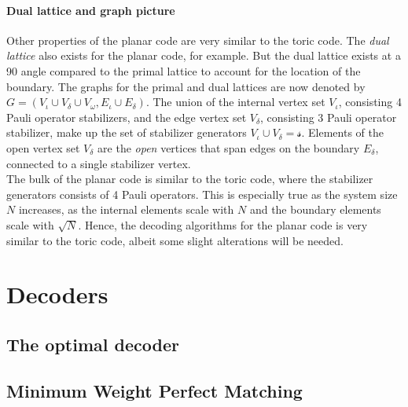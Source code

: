 \paragraph{Dual lattice and graph picture}
Other properties of the planar code are very similar to the toric code. The \emph{dual lattice} also exists for the planar code, for example. But the dual lattice exists at a 90 angle compared to the primal lattice to account for the location of the boundary. The graphs for the primal and dual lattices are now denoted by $G = (V_\iota\cup V_{\delta} \cup V_{\omega}, E_\iota \cup E_{\delta})$. The union of the internal vertex set $V_\iota$, consisting 4 Pauli operator stabilizers, and the edge vertex set $V_{\delta}$, consisting 3 Pauli operator stabilizer, make up the set of stabilizer generators $V_\iota \cup V_{\delta}=\mathscr{s}$. Elements of the open vertex set $V_\delta$ are the \emph{open} vertices that span edges on the boundary $E_{\delta}$, connected to a single stabilizer vertex.\\

The bulk of the planar code is similar to the toric code, where the stabilizer generators consists of 4 Pauli operators. This is especially true as the system size $N$ increases, as the internal elements scale with $N$ and the boundary elements scale with $\sqrt{N}$. Hence, the decoding algorithms for the planar code is very similar to the toric code, albeit some slight alterations will be needed. 
\section{Decoders}\label{sec:surface_decoders}
\subsection{The optimal decoder}\label{sec:optimal_decoder}
\subsection{Minimum Weight Perfect Matching}\label{sec:MWPMdecoder}

